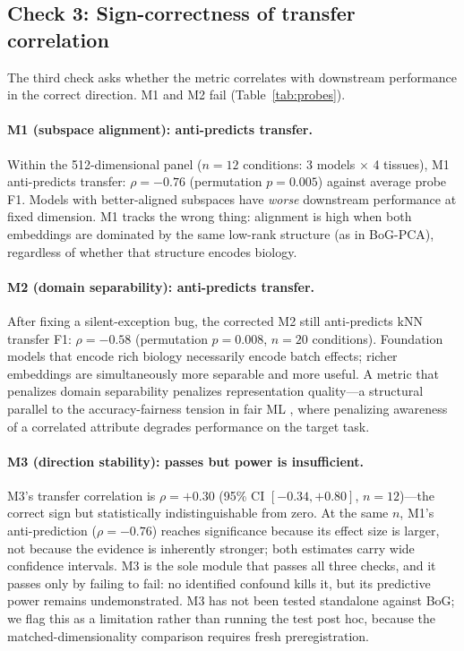 \documentclass[9pt,lineno]{elife}
\begin{document}
\subsection{Check 3: Sign-correctness of transfer correlation}

The third check asks whether the metric correlates with downstream performance in the correct direction. M1 and M2 fail (Table~\ref{tab:probes}).

\paragraph{M1 (subspace alignment): anti-predicts transfer.} Within the 512-dimensional panel ($n = 12$ conditions: 3 models $\times$ 4 tissues), M1 anti-predicts transfer: $\rho = -0.76$ (permutation $p = 0.005$) against average probe F1. Models with better-aligned subspaces have \emph{worse} downstream performance at fixed dimension. M1 tracks the wrong thing: alignment is high when both embeddings are dominated by the same low-rank structure (as in BoG-PCA), regardless of whether that structure encodes biology.

\paragraph{M2 (domain separability): anti-predicts transfer.} After fixing a silent-exception bug, the corrected M2 still anti-predicts kNN transfer F1: $\rho = -0.58$ (permutation $p = 0.008$, $n = 20$ conditions). Foundation models that encode rich biology necessarily encode batch effects; richer embeddings are simultaneously more separable and more useful. A metric that penalizes domain separability penalizes representation quality---a structural parallel to the accuracy-fairness tension in fair ML \citep{chouldechova2017impossibility}, where penalizing awareness of a correlated attribute degrades performance on the target task.

\paragraph{M3 (direction stability): passes but power is insufficient.} M3's transfer correlation is $\rho = +0.30$ (95\% CI $[-0.34, +0.80]$, $n = 12$)---the correct sign but statistically indistinguishable from zero. At the same $n$, M1's anti-prediction ($\rho = -0.76$) reaches significance because its effect size is larger, not because the evidence is inherently stronger; both estimates carry wide confidence intervals. M3 is the sole module that passes all three checks, and it passes only by failing to fail: no identified confound kills it, but its predictive power remains undemonstrated. M3 has not been tested standalone against BoG; we flag this as a limitation rather than running the test post hoc, because the matched-dimensionality comparison requires fresh preregistration.
\end{document}
